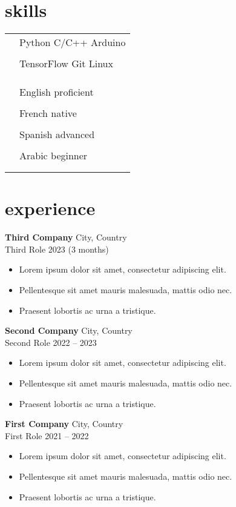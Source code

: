 \documentclass[12pt]{article}
\newcommand{\entry}[4]{{{\textbf{#1}}} \hfill #3 \\ #2 \hfill #4}
\newcommand{\tableentry}[3]{\textsc{#1} & #2\expandafter\ifstrequal\expandafter{#3}{}{\\}{\\[6pt]}}
\begin{document}
\begin{paracol}{2}
\section{skills}
\begin{supertabular}{rl}
  \tableentry{\footnotesize\faCode}{Python \textperiodcentered{} C/C++ \textperiodcentered{} Arduino}{}
  \tableentry{}{TensorFlow \textperiodcentered{} Git \textperiodcentered{} Linux}{}
  \tableentry{}{}{}

  \tableentry{\footnotesize\faLanguage}{English \textperiodcentered{} proficient}{}
  \tableentry{}{French \textperiodcentered{} native}{}
  \tableentry{}{Spanish \textperiodcentered{} advanced}{}
  \tableentry{}{Arabic \textperiodcentered{} beginner}{}
\end{supertabular}

\switchcolumn*

\section{experience}

\entry{Third Company}{Third Role}{City, Country}{2023 (3 months)}
\begin{itemize}[noitemsep,leftmargin=3.5mm,rightmargin=0mm,topsep=6pt]
  \item Lorem ipsum dolor sit amet, consectetur adipiscing elit.
  \item Pellentesque sit amet mauris malesuada, mattis odio nec.
  \item Praesent lobortis ac urna a tristique.
\end{itemize}

\medskip

\entry{Second Company}{Second Role}{City, Country}{2022 -- 2023}
\begin{itemize}[noitemsep,leftmargin=3.5mm,rightmargin=0mm,topsep=6pt]
  \item Lorem ipsum dolor sit amet, consectetur adipiscing elit.
  \item Pellentesque sit amet mauris malesuada, mattis odio nec.
  \item Praesent lobortis ac urna a tristique.
\end{itemize}

\medskip

\entry{First Company}{First Role}{City, Country}{2021 -- 2022}
\begin{itemize}[noitemsep,leftmargin=3.5mm,rightmargin=0mm,topsep=6pt]
  \item Lorem ipsum dolor sit amet, consectetur adipiscing elit.
  \item Pellentesque sit amet mauris malesuada, mattis odio nec.
  \item Praesent lobortis ac urna a tristique.
\end{itemize}


\end{paracol}
\end{document}
